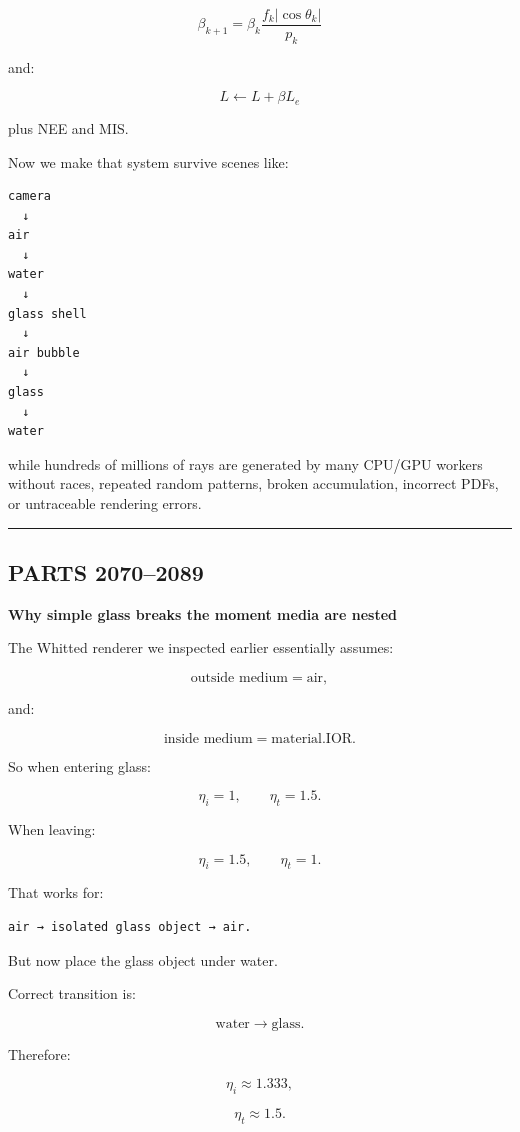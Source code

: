 \[
\beta_{k+1}
=
\beta_k
\frac{
f_k|\cos\theta_k|
}{
p_k
}
\]

and:

\[
L
\leftarrow
L+
\beta L_e
\]

plus NEE and MIS.

Now we make that system survive scenes like:

\begin{verbatim}
camera
  ↓
air
  ↓
water
  ↓
glass shell
  ↓
air bubble
  ↓
glass
  ↓
water
\end{verbatim}

while hundreds of millions of rays are generated by many CPU/GPU workers without races, repeated random patterns, broken accumulation, incorrect PDFs, or untraceable rendering errors.

\begin{center}\rule{0.5\linewidth}{0.5pt}\end{center}

\subsection{PARTS 2070--2089}\label{03-visual-computing-i-ch010-parts-20702089}

\textbf{Why simple glass breaks the moment media are nested}

The Whitted renderer we inspected earlier essentially assumes:

\[
\text{outside medium}=\text{air},
\]

and:

\[
\text{inside medium}=\text{material.IOR}.
\]

So when entering glass:

\[
\eta_i=1,
\qquad
\eta_t=1.5.
\]

When leaving:

\[
\eta_i=1.5,
\qquad
\eta_t=1.
\]

That works for:

\begin{verbatim}
air → isolated glass object → air.
\end{verbatim}

But now place the glass object under water.

Correct transition is:

\[
\text{water}
\rightarrow
\text{glass}.
\]

Therefore:

\[
\eta_i\approx1.333,
\]

\[
\eta_t\approx1.5.
\]

